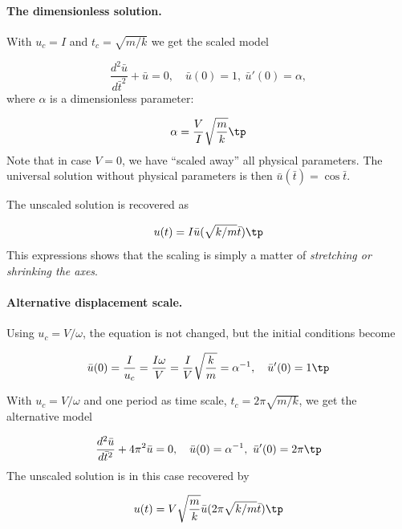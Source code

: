 \documentclass[graybox,envcountchap,sectrefs,final]{svmonodo}
\begin{document}
\paragraph{The dimensionless solution.}
With $u_c=I$ and $t_c=\sqrt{m/k}$ we get the scaled model

\begin{equation}
\frac{d^2\bar u}{d\bar t^2} + \bar u = 0,
\quad \bar u(0)=1,\ \bar u'(0)=\alpha,
\label{sec:scale:vib:undamped:model:scaled1}
\end{equation}
where $\alpha$ is a dimensionless parameter:

\[ \alpha = \frac{V}{I}\sqrt{\frac{m}{k}}\tp\]
Note that in case $V=0$, we have ``scaled away'' all physical parameters.
The universal solution without physical parameters is then
$\bar u(\bar t)=\cos\bar t$.

The unscaled solution is recovered as

\begin{equation}
u(t) = I\bar u(\sqrt{k/m}\bar t)\tp
\end{equation}
This expressions shows that the scaling is simply a matter of
\emph{stretching or shrinking the axes}.

\paragraph{Alternative displacement scale.}
Using $u_c = V/\omega$, the equation
is not changed, but the initial conditions become

\[ \bar u(0) = \frac{I}{u_c} = \frac{I\omega}{V} =\frac{I}{V}\sqrt{\frac{k}{m}} = \alpha^{-1},\quad \bar u'(0)=1\tp\]


With $u_c=V/\omega$ and one period as time scale,
$t_c=2\pi\sqrt{m/k}$,
we get the alternative model

\begin{equation}
\frac{d^2\bar u}{d\bar t^2} + 4\pi^2 \bar u = 0,
\quad \bar u(0)=\alpha^{-1},\ \bar u'(0)=2\pi\tp
\label{sec:scale:vib:undamped:model:scaled2}
\end{equation}
The unscaled solution is in this case recovered by

\begin{equation}
u(t) = V\sqrt{\frac{m}{k}}\bar u(2\pi\sqrt{k/m}\bar t)\tp
\end{equation}

\end{document}
